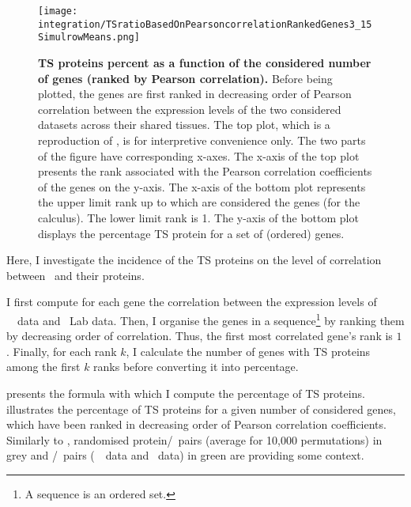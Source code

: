 \begin{figure}[!ht]
    \texttt{[image: integration/TSratioBasedOnPearsoncorrelationRankedGenes3\_15SimulrowMeans.png]}\centering
    \vspace{-3mm}
    \caption[TS proteins percentage as a function of
    the considered number of genes (ranked by Pearson correlation)]{\label{fig:Spe_Cor}%
    \textbf{TS proteins percent as a function of the considered
    number of genes (ranked by Pearson correlation).}
    Before being plotted,
    the genes are first ranked in decreasing order of Pearson correlation
    between the expression levels of the two considered datasets
    across their shared tissues.
    The top plot, which is a reproduction of ,
    is for interpretive convenience only.
    The two parts of the figure have corresponding x-axes.
    The x-axis of the top plot presents the rank associated with
    the Pearson correlation coefficients of the genes on the y-axis.
    The x-axis of the bottom plot represents
    the upper limit rank up to which are considered
    the genes (for the calculus).
    The lower limit rank is 1.
    The y-axis of the bottom plot displays the percentage \gls{TS} protein
    for a set of (ordered) genes.
    }
\end{figure}

Here,
I investigate the incidence of the \gls{TS} proteins
on the level of correlation between \mRNAs\ and their proteins.

I first compute for each gene the correlation between the expression levels
of \uhlen\ \etal\ data and \pandey\ Lab data.
Then, I organise the genes in a sequence\footnote{A sequence is an ordered set.}
by ranking them by decreasing order of correlation.
Thus, the first most correlated gene's rank is $1$.
Finally, for each rank $k$, I calculate the number of genes with \gls{TS} proteins
among the first $k$ ranks before converting it into percentage.\mybr\

 presents the formula with which I compute
the percentage of \gls{TS} proteins.
 illustrates the percentage of \gls{TS} proteins
for a given number of considered genes,
which have been ranked in decreasing order of Pearson correlation coefficients.
Similarly to ,
randomised protein/\mRNA\ pairs (average for 10,000 permutations) in grey
and \mRNA/\mRNA\ pairs (\uhlen\ \etal\ data and \gtex\ data) in green
are providing some context.\mybr\

